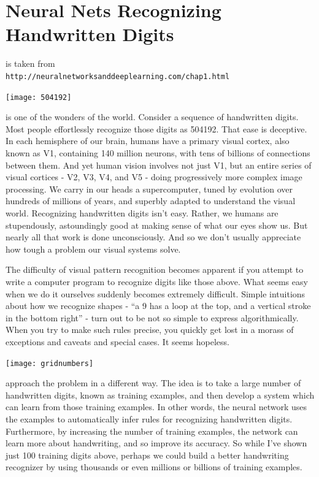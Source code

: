 


\chapter{Neural Nets Recognizing Handwritten Digits}
\label{sec:UsingNeuralNetsTorRcognizeHandWrittenDigits}

 is taken from\\
\lstinline{http://neuralnetworksanddeeplearning.com/chap1.html}

\begin{marginfigure}
\texttt{[image: 504192]}
\end{marginfigure}

 is one of the wonders of the world. Consider a sequence of handwritten digits. 
Most people effortlessly recognize those digits as 504192. That ease is deceptive. In each hemisphere of our brain, humans have a primary visual cortex, also known as V1, containing 140 million neurons, with tens of billions of connections between them. And yet human vision involves not just V1, but an entire series of visual cortices - V2, V3, V4, and V5 - doing progressively more complex image processing. We carry in our heads a supercomputer, tuned by evolution over hundreds of millions of years, and superbly adapted to understand the visual world. Recognizing handwritten digits isn't easy. Rather, we humans are stupendously, astoundingly good at making sense of what our eyes show us. But nearly all that work is done unconsciously. And so we don't usually appreciate how tough a problem our visual systems solve.

The difficulty of visual pattern recognition becomes apparent if you attempt to write a computer program to recognize digits like those above. What seems easy when we do it ourselves suddenly becomes extremely difficult. Simple intuitions about how we recognize shapes - ``a 9 has a loop at the top, and a vertical stroke in the bottom right'' - turn out to be not so simple to express algorithmically. When you try to make such rules precise, you quickly get lost in a morass of exceptions and caveats and special cases. It seems hopeless.


\begin{marginfigure}
\texttt{[image: gridnumbers]}
\end{marginfigure}

 approach the problem in a different way. The idea is to take a large number of handwritten digits, known as training examples, and then develop a system which can learn from those training examples. In other words, the neural network uses the examples to automatically infer rules for recognizing handwritten digits. Furthermore, by increasing the number of training examples, the network can learn more about handwriting, and so improve its accuracy. So while I've shown just 100 training digits above, perhaps we could build a better handwriting recognizer by using thousands or even millions or billions of training examples.

